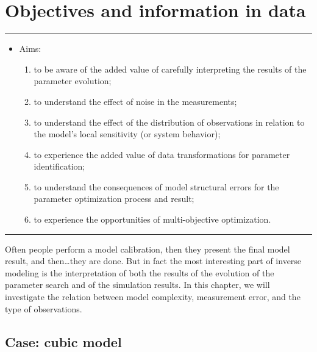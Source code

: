 \chapter{Objectives and information in data}
\thispagestyle{fancy}
\label{ch:objectives-and-information-in-data}



\hrule
\begin{itemize}
\footnotesize
\item[]{Aims:}
\begin{enumerate}
\item{to be aware of the added value of carefully interpreting the results of
the parameter evolution;}
\item{to understand the effect of noise in the measurements;}
\item{to understand the effect of the distribution of observations in relation
to the model's local sensitivity (or system behavior);}
\item{to experience the added value of data transformations for parameter
identification;}
\item{to understand the consequences of model structural errors for the
parameter optimization process and result;}
\item{to experience the opportunities of multi-objective optimization.}
\end{enumerate}
\end{itemize}
\hrule
\vspace{1em}


Often people perform a model calibration, then they present the final model
result, and then\ldots they are done. But in fact the most interesting part of
inverse modeling is the interpretation of both the results of the evolution of
the parameter search and of the simulation results. In this chapter, we will
investigate the relation between model complexity, measurement error, and the
type of observations.

\section{Case: cubic model}


